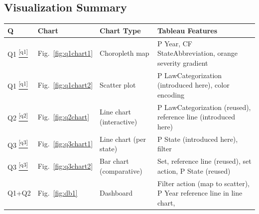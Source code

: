 \documentclass[a4paper,11pt]{article}
\newcommand*{\sref}[1]{%
  \hyperref[{#1}]{%
    \color{accent}\textsuperscript{\ref*{#1}}%
  }%
}
\begin{document}
\newpage
\subsection{Visualization Summary}

\begin{table}[H]
	\centering
	\renewcommand{\arraystretch}{1.35}
	\begin{tabular}{p{1.0cm} p{1.0cm} p{3.9cm} p{9cm}}
		\toprule
		\rowcolor{utaddark}
		\color{white}\textbf{Q}          &
		\color{white}\textbf{Chart}      &
		\color{white}\textbf{Chart Type} &
		\color{white}\textbf{Tableau Features}                                                                                             \\
		\midrule
		\rowcolor{utadrow}
		Q1\sref{q1}                      & Fig.~\ref{fig:q1chart1}                                              & Choropleth map
		                                 & P Year, CF StateAbbreviation, orange severity gradient                                          \\
		Q1\sref{q1}                      & Fig.~\ref{fig:q1chart2}                                              & Scatter plot
		                                 & P LawCategorization (introduced here), color encoding                                           \\
		\rowcolor{utadrow}
		Q2\sref{q2}                      & Fig.~\ref{fig:q2chart}                                               & Line chart (interactive)
		                                 & P LawCategorization (reused), reference line (introduced here)                                  \\
		Q3\sref{q3}                      & Fig.~\ref{fig:q3chart1}                                              & Line chart (per state)
		                                 & P State (introduced here), filter                                                               \\
		\rowcolor{utadrow}
		Q3\sref{q3}                      & Fig.~\ref{fig:q3chart2}                                              & Bar chart (comparative)
		                                 & Set, reference line (reused), set action, P State (reused)                                      \\
		Q1+Q2                            & Fig.~\ref{fig:db1}                                                   & Dashboard
		                                 & Filter action (map to scatter), P Year reference line in line chart,

\end{tabular}
\end{table}
\end{document}
